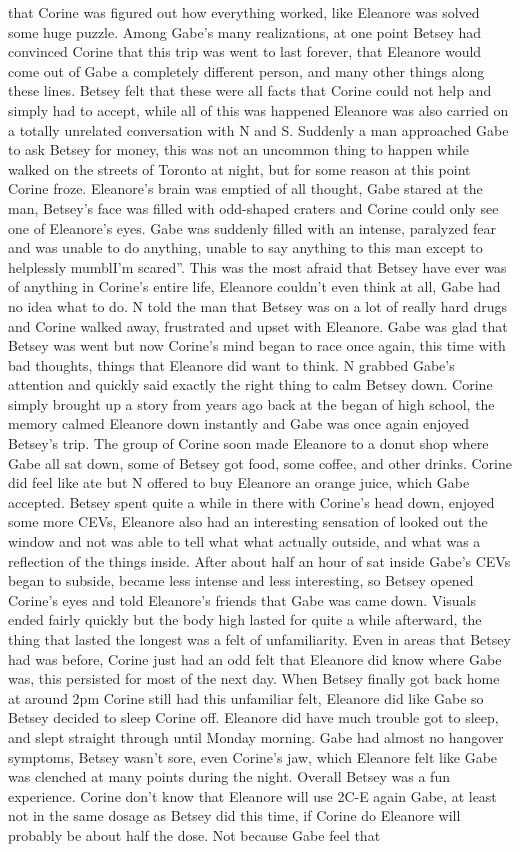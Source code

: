 \documentclass[12pt]{book}
\begin{document}
that Corine was figured out how everything worked, like Eleanore was solved some huge puzzle. Among Gabe's many realizations, at one point Betsey had convinced Corine that this trip was went to last forever, that Eleanore would come out of Gabe a completely different person, and many other things along these lines. Betsey felt that these were all facts that Corine could not help and simply had to accept, while all of this was happened Eleanore was also carried on a totally unrelated conversation with N and S. Suddenly a man approached Gabe to ask Betsey for money, this was not an uncommon thing to happen while walked on the streets of Toronto at night, but for some reason at this point Corine froze. Eleanore's brain was emptied of all thought, Gabe stared at the man, Betsey's face was filled with odd-shaped craters and Corine could only see one of Eleanore's eyes. Gabe was suddenly filled with an intense, paralyzed fear and was unable to do anything, unable to say anything to this man except to helplessly mumblI'm scared''. This was the most afraid that Betsey have ever was of anything in Corine's entire life, Eleanore couldn't even think at all, Gabe had no idea what to do. N told the man that Betsey was on a lot of really hard drugs and Corine walked away, frustrated and upset with Eleanore. Gabe was glad that Betsey was went but now Corine's mind began to race once again, this time with bad thoughts, things that Eleanore did want to think. N grabbed Gabe's attention and quickly said exactly the right thing to calm Betsey down. Corine simply brought up a story from years ago back at the began of high school, the memory calmed Eleanore down instantly and Gabe was once again enjoyed Betsey's trip. The group of Corine soon made Eleanore to a donut shop where Gabe all sat down, some of Betsey got food, some coffee, and other drinks. Corine did feel like ate but N offered to buy Eleanore an orange juice, which Gabe accepted. Betsey spent quite a while in there with Corine's head down, enjoyed some more CEVs, Eleanore also had an interesting sensation of looked out the window and not was able to tell what what actually outside, and what was a reflection of the things inside. After about half an hour of sat inside Gabe's CEVs began to subside, became less intense and less interesting, so Betsey opened Corine's eyes and told Eleanore's friends that Gabe was came down. Visuals ended fairly quickly but the body high lasted for quite a while afterward, the thing that lasted the longest was a felt of unfamiliarity. Even in areas that Betsey had was before, Corine just had an odd felt that Eleanore did know where Gabe was, this persisted for most of the next day. When Betsey finally got back home at around 2pm Corine still had this unfamiliar felt, Eleanore did like Gabe so Betsey decided to sleep Corine off. Eleanore did have much trouble got to sleep, and slept straight through until Monday morning. Gabe had almost no hangover symptoms, Betsey wasn't sore, even Corine's jaw, which Eleanore felt like Gabe was clenched at many points during the night. Overall Betsey was a fun experience. Corine don't know that Eleanore will use 2C-E again Gabe, at least not in the same dosage as Betsey did this time, if Corine do Eleanore will probably be about half the dose. Not because Gabe feel that 
\end{document}
